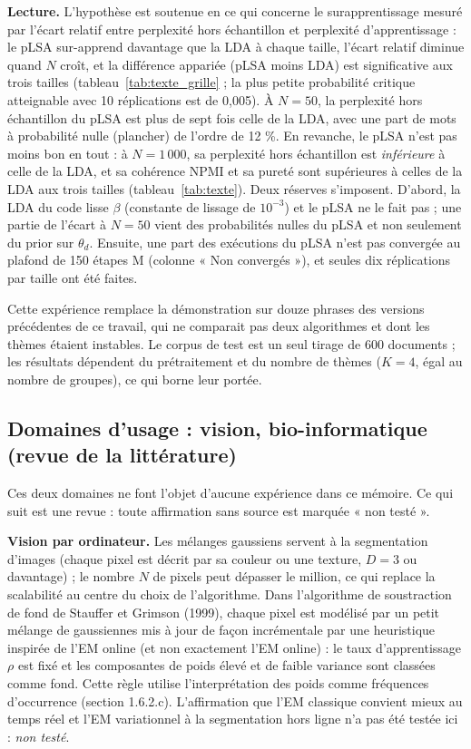 
\textbf{Lecture. }L'hypothèse est soutenue en ce qui concerne le surapprentissage mesuré par l'écart relatif entre perplexité hors échantillon et perplexité d'apprentissage : le pLSA sur-apprend davantage que la LDA à chaque taille, l'écart relatif diminue quand $N$ croît, et la différence appariée (pLSA moins LDA) est significative aux trois tailles (tableau~\ref{tab:texte_grille} ; la plus petite probabilité critique atteignable avec 10 réplications est de 0,005). À $N=50$, la perplexité hors échantillon du pLSA est plus de sept fois celle de la LDA, avec une part de mots à probabilité nulle (plancher) de l'ordre de 12 \%. En revanche, le pLSA n'est pas moins bon en tout : à $N=1\,000$, sa perplexité hors échantillon est \emph{inférieure} à celle de la LDA, et sa cohérence NPMI et sa pureté sont supérieures à celles de la LDA aux trois tailles (tableau~\ref{tab:texte}). Deux réserves s'imposent. D'abord, la LDA du code lisse $\beta$ (constante de lissage de $10^{-3}$) et le pLSA ne le fait pas ; une partie de l'écart à $N=50$ vient des probabilités nulles du pLSA et non seulement du prior sur $\theta_d$. Ensuite, une part des exécutions du pLSA n'est pas convergée au plafond de 150 étapes M (colonne « Non convergés »), et seules dix réplications par taille ont été faites.

Cette expérience remplace la démonstration sur douze phrases des versions précédentes de ce travail, qui ne comparait pas deux algorithmes et dont les thèmes étaient instables. Le corpus de test est un seul tirage de 600 documents ; les résultats dépendent du prétraitement et du nombre de thèmes ($K=4$, égal au nombre de groupes), ce qui borne leur portée.


\subsection{Domaines d'usage : vision, bio-informatique (revue de la littérature)}
Ces deux domaines ne font l'objet d'aucune expérience dans ce mémoire. Ce qui suit est une revue : toute affirmation sans source est marquée « non testé ».

\textbf{Vision par ordinateur. }Les mélanges gaussiens servent à la segmentation d'images (chaque pixel est décrit par sa couleur ou une texture, $D=3$ ou davantage) ; le nombre $N$ de pixels peut dépasser le million, ce qui replace la scalabilité au centre du choix de l'algorithme. Dans l'algorithme de soustraction de fond de Stauffer et Grimson (1999), chaque pixel est modélisé par un petit mélange de gaussiennes mis à jour de façon incrémentale par une heuristique inspirée de l'EM online (et non exactement l'EM online) : le taux d'apprentissage $\rho$ est fixé et les composantes de poids élevé et de faible variance sont classées comme fond. Cette règle utilise l'interprétation des poids comme fréquences d'occurrence (section 1.6.2.c). L'affirmation que l'EM classique convient mieux au temps réel et l'EM variationnel à la segmentation hors ligne n'a pas été testée ici : \emph{non testé}.

